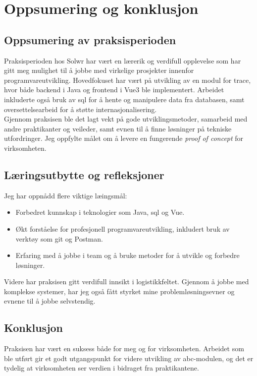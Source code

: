\section{Oppsumering og konklusjon}

\subsection{Oppsumering av praksisperioden}

Praksisperioden hos Solwr har vært en lærerik og verdifull opplevelse som har gitt meg mulighet til å jobbe med virkelige prosjekter innenfor programvareutvikling. Hovedfokuset har vært på utvikling av en modul for \gls{trace}, hvor både backend i Java og frontend i Vue3 ble implementert. Arbeidet inkluderte også bruk av \gls{sql} for å hente og manipulere data fra databasen, samt oversettelsearbeid for å støtte internasjonalisering. \\

Gjennom praksisen ble det lagt vekt på gode utviklingsmetoder, samarbeid med andre praktikanter og veileder, samt evnen til å finne løsninger på tekniske utfordringer. Jeg oppfylte målet om å levere en fungerende \textit{proof of concept} for virksomheten.

\subsection{Læringsutbytte og refleksjoner}

Jeg har oppnådd flere viktige læingsmål:
\begin{itemize}
    \item Forbedret kunnskap i teknologier som Java, \gls{sql} og Vue.
    \item Økt forståelse for profesjonell programvareutvikling, inkludert bruk av verktøy som \Gls{git} og Postman.
    \item Erfaring med å jobbe i team og å bruke metoder for å utvikle og forbedre løsninger.
\end{itemize}

Videre har praksisen gitt verdifull innsikt i logistikkfeltet. Gjennom å jobbe med komplekse systemer, har jeg også fått styrket mine problemløsningsevner og evnene til å jobbe selvstendig. 

\subsection{Konklusjon}

Praksisen har vært en suksess både for meg og for virksomheten. Arbeidet som ble utført gir et godt utgangspunkt for videre utvikling av \gls{abc}-modulen, og det er tydelig at virksomheten ser verdien i bidraget fra praktikantene. \\

